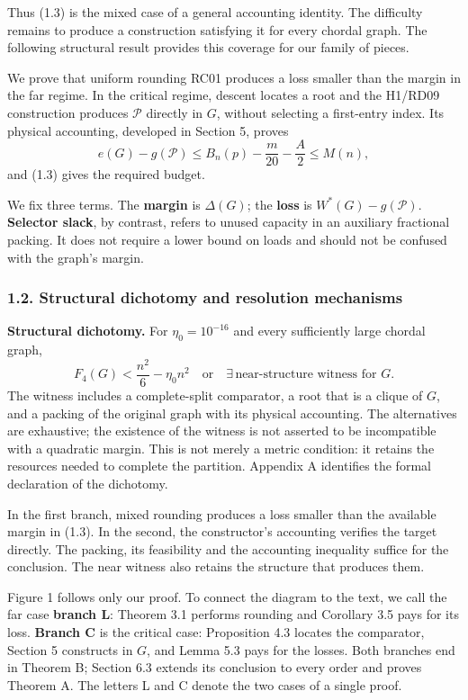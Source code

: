 \documentclass[english,11pt,a4paper]{article}
\begin{document}
Thus (1.3) is the mixed case of a general accounting identity. The difficulty remains to produce a construction satisfying it for every chordal graph. The following structural result provides this coverage for our family of pieces.

We prove that uniform rounding RC01 produces a loss smaller than the margin in the far regime. In the critical regime, descent locates a root and the H1/RD09 construction produces \(\mathcal P\) directly in \(G\), without selecting a first-entry index. Its physical accounting, developed in Section 5, proves \[
e(G)-g(\mathcal P)
\le B_n(p)-\frac m{20}-\frac A2
\le M(n),
\tag{1.4}
\] and (1.3) gives the required budget.

We fix three terms. The \textbf{margin} is \(\Delta(G)\); the \textbf{loss} is \(W^*(G)-g(\mathcal P)\). \textbf{Selector slack}, by contrast, refers to unused capacity in an auxiliary fractional packing. It does not require a lower bound on loads and should not be confused with the graph's margin.

\subsubsection{1.2. Structural dichotomy and resolution mechanisms}\label{structural-dichotomy-and-resolution-mechanisms}

\textbf{Structural dichotomy.} For \(\eta_0=10^{-16}\) and every sufficiently large chordal graph, \[
\boxed{
F_4(G)<\frac{n^2}{6}-\eta_0n^2
\quad\text{or}\quad
\exists\,\text{near-structure witness for }G.
}
\tag{1.5}
\] The witness includes a complete-split comparator, a root that is a clique of \(G\), and a packing of the original graph with its physical accounting. The alternatives are exhaustive; the existence of the witness is not asserted to be incompatible with a quadratic margin. This is not merely a metric condition: it retains the resources needed to complete the partition. Appendix A identifies the formal declaration of the dichotomy.

In the first branch, mixed rounding produces a loss smaller than the available margin in (1.3). In the second, the constructor's accounting verifies the target directly. The packing, its feasibility and the accounting inequality suffice for the conclusion. The near witness also retains the structure that produces them.

Figure 1 follows only our proof. To connect the diagram to the text, we call the far case \textbf{branch L}: Theorem 3.1 performs rounding and Corollary 3.5 pays for its loss. \textbf{Branch C} is the critical case: Proposition 4.3 locates the comparator, Section 5 constructs in \(G\), and Lemma 5.3 pays for the losses. Both branches end in Theorem B; Section 6.3 extends its conclusion to every order and proves Theorem A. The letters L and C denote the two cases of a single proof.
\end{document}
